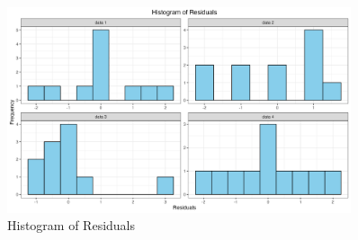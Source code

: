 \documentclass[12pt]{article}
\begin{document}
\begin{figure}[!h]
  \centering
  \includegraphics[width=0.9\textwidth]{../results/residuals_histogram.png}
  \caption{Histogram of Residuals}
  \label{fig:residuals_histogram}
\end{figure}
\end{document}
